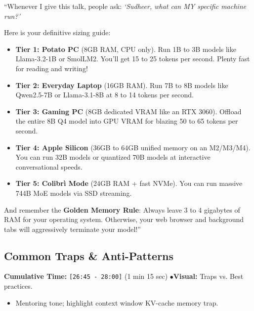 \documentclass[11pt,a4paper]{article}
\begin{document}
\begin{speechbox}
``Whenever I give this talk, people ask: \textit{`Sudheer, what can MY specific machine run?'}

Here is your definitive sizing guide:
\begin{itemize}
    \item \textbf{Tier 1: Potato PC} (8GB RAM, CPU only). Run 1B to 3B models like Llama-3.2-1B or SmolLM2. You'll get 15 to 25 tokens per second. Plenty fast for reading and writing!
    \item \textbf{Tier 2: Everyday Laptop} (16GB RAM). Run 7B to 8B models like Qwen2.5-7B or Llama-3.1-8B at 8 to 14 tokens per second.
    \item \textbf{Tier 3: Gaming PC} (8GB dedicated VRAM like an RTX 3060). Offload the entire 8B Q4 model into GPU VRAM for blazing 50 to 65 tokens per second.
    \item \textbf{Tier 4: Apple Silicon} (36GB to 64GB unified memory on an M2/M3/M4). You can run 32B models or quantized 70B models at interactive conversational speeds.
    \item \textbf{Tier 5: Colibr\`i Mode} (24GB RAM + fast NVMe). You can run massive 744B MoE models via SSD streaming.
\end{itemize}

And remember the \textbf{Golden Memory Rule}: Always leave 3 to 4 gigabytes of RAM for your operating system. Otherwise, your web browser and background tabs will aggressively terminate your model!''
\end{speechbox}

\subsection{Common Traps \& Anti-Patterns}
\begin{directionbox}
    \textbf{Cumulative Time:} \texttt{[26:45 - 28:00]} (1 min 15 sec) \quad$\bullet$\quad \textbf{Visual:} Traps vs. Best practices.
    \begin{itemize}
        \item Mentoring tone; highlight context window KV-cache memory trap.
    \end{itemize}
\end{directionbox}
\end{document}
